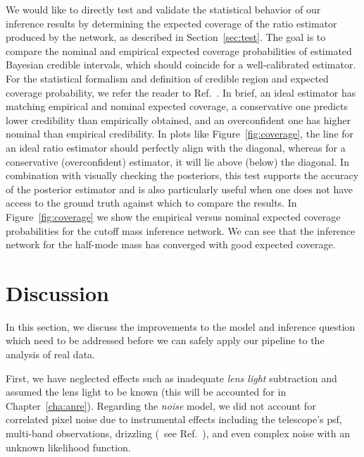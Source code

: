We would like to directly test and validate the statistical behavior of our inference results by determining the expected coverage of the ratio estimator produced by the network, as described in Section~\ref{sec:test}. The goal is to compare the nominal and empirical expected coverage probabilities of estimated Bayesian credible intervals, which should coincide for a well-calibrated estimator. For the statistical formalism and definition of credible region and expected coverage probability, we refer the reader to Ref.~\cite{Hermans:2021rqv}. In brief, an ideal estimator has matching empirical and nominal expected coverage, a conservative one predicts lower credibility than empirically obtained, and an overconfident one has higher nominal than empirical credibility. In plots like Figure~\ref{fig:coverage}, the line for an ideal ratio estimator should perfectly align with the diagonal, whereas for a conservative (overconfident) estimator, it will lie above (below) the diagonal.
In combination with visually checking the posteriors, this test supports the accuracy of the posterior estimator and is also particularly useful when one does not have access to the ground truth against which to compare the results.
In Figure~\ref{fig:coverage} we show the empirical versus nominal expected coverage probabilities for the cutoff mass inference network. We can see that the inference network for the half-mode mass has converged with good expected coverage. 


\section{Discussion}\label{sec:sl-discussion}

In this section, we discuss the improvements to the model and inference question which need to be addressed before we can safely apply our pipeline to the analysis of real data. 

First, we have neglected effects such as inadequate \emph{lens light} subtraction and assumed the lens light to be known (this will be accounted for in Chapter~\ref{cha:anre}). Regarding the \emph{noise} model, we did not account for correlated pixel noise due to instrumental effects including the telescope's \gls*{psf}, multi-band observations, drizzling  (\eg~see Ref.~\cite{Wagner-Carena:2022mrn}), and even complex noise with an unknown likelihood function.


